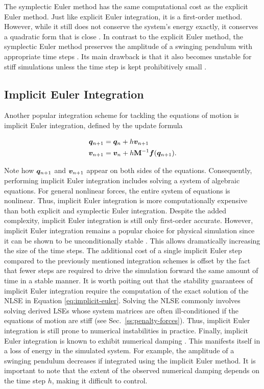\noindent The symplectic Euler method has the same computational cost as the explicit Euler method. Just like explicit Euler integration, it 
is a first-order method. However, while it still does not conserve the system's energy exactly, it conserves a quadratic form that is close 
\cite{servin2006}. In contrast to the explicit Euler method, the symplectic Euler method preserves the amplitude of a swinging pendulum with 
appropriate time steps \cite{stern2006}. Its main drawback is that it also becomes unstable for stiff simulations unless the time step is 
kept prohibitively small \cite{servin2006}. 

\subsection{Implicit Euler Integration}\label{ss:implicit-euler}
Another popular integration scheme for tackling the equations of motion is implicit Euler integration, defined by the update formula

\begin{align}
    \begin{split}\label{eq:implicit-euler}
        \bm{q}_{n+1} &= \bm{q}_n + h\bm{v}_{n+1}\\
        \bm{v}_{n+1} &= \bm{v}_n + h\mathbf{M}^{-1}\bm{f}(\bm{q}_{n+1}).
    \end{split}
\end{align}

\noindent Note how $\bm{q}_{n+1}$ and $\bm{v}_{n+1}$ appear on both sides of the equations. Consequently, performing implicit 
Euler integration includes solving a system of algebraic equations. For general nonlinear forces, the entire system of equations is nonlinear.
Thus, implicit Euler integration is more computationally expensive than both explicit and symplectic Euler integration. 
Despite the added complexity, implicit Euler integration is still only first-order accurate. However, implicit Euler integration 
remains a popular choice for physical simulation since it can be shown to be unconditionally stable \cite{chapra2005}. This allows 
dramatically increasing the size of the time steps. The additional cost of a single implicit Euler 
step compared to the previously mentioned integration schemes is offset by the fact that fewer steps are required to drive the 
simulation forward the same amount of time in a stable manner. It is worth poiting out that the stability guarantees of implicit Euler 
integration require the computation of the exact solution of the NLSE in Equation \ref{eq:implicit-euler}. Solving the NLSE commonly involves
solving derived LSEs whose system matrices are often ill-conditioned if the equations of motion are stiff (see Sec.\ \ref{ss:penalty-forces}). 
Thus, implicit Euler integration is still prone to numerical instabilities in practice. Finally, implicit Euler integration is known 
to exhibit numerical 
damping \cite{stern2006}. This manifests itself in a loss of energy in the simulated system. For example, the amplitude of a swinging 
pendulum decreases if integrated using the implicit Euler method. It is important to note that the extent of the observed numerical damping
depends on the time step $h$, making it difficult to control.

